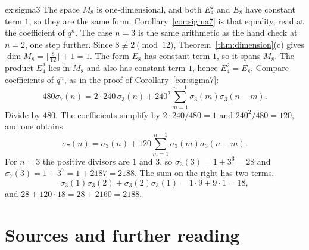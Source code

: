\begin{solution}{ex:sigma3}
\idea The space $M_8$ is one-dimensional, and both $E_4^2$ and $E_8$ have constant term $1$, so they are the same form. Corollary~\ref{cor:sigma7} is that equality, read at the coefficient of $q^n$. The case $n=3$ is the same arithmetic as the hand check at $n=2$, one step further.
\writeup Since $8\not\equiv2\pmod{12}$, Theorem~\ref{thm:dimension}(c) gives $\dim M_8=\bigl\lfloor\frac8{12}\bigr\rfloor+1=1$. The form $E_8$ has constant term $1$, so it spans $M_8$. The product $E_4^2$ lies in $M_8$ and also has constant term $1$, hence $E_4^2=E_8$.
Compare coefficients of $q^n$, as in the proof of Corollary~\ref{cor:sigma7}:
\[
480\sigma_7(n)=2\cdot240\,\sigma_3(n)+240^2\sum_{m=1}^{n-1}\sigma_3(m)\sigma_3(n-m).
\]
Divide by $480$. The coefficients simplify by $2\cdot240/480=1$ and $240^2/480=120$, and one obtains
\[
\sigma_7(n)=\sigma_3(n)+120\sum_{m=1}^{n-1}\sigma_3(m)\sigma_3(n-m).
\]
For $n=3$ the positive divisors are $1$ and $3$, so $\sigma_3(3)=1+3^3=28$ and $\sigma_7(3)=1+3^7=1+2187=2188$. The sum on the right has two terms,
\[
\sigma_3(1)\sigma_3(2)+\sigma_3(2)\sigma_3(1)=1\cdot9+9\cdot1=18,
\]
and $28+120\cdot18=28+2160=2188$.
\end{solution}

\section*{Sources and further reading}

